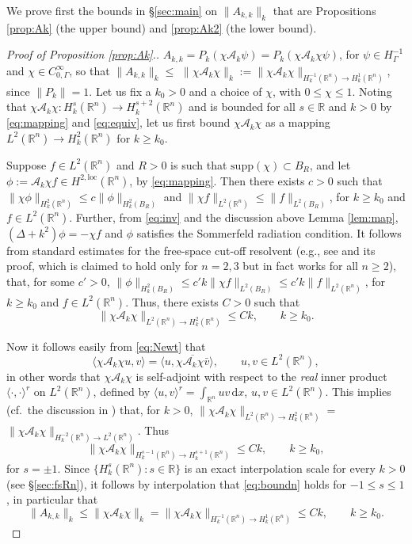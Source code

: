 \documentclass{birkjour}
\theoremstyle{definition}
\theoremstyle{remark}
\numberwithin{equation}{section}
\newcommand{\R}{\mathbb{R}}
\newcommand{\cA}{\mathcal{A}}
\newcommand{\supp}{\mathrm{supp}}
\newcommand{\rd}{\mathrm{d}}
\begin{document}
We prove first the bounds in \S\ref{sec:main} on $\|A_{k,k}\|_k$ that are Propositions \ref{prop:Ak} (the upper bound) and \ref{prop:Ak2} (the lower bound).

\begin{proof}[Proof of Proposition \ref{prop:Ak}.]
$A_{k,k} = P_k(\chi\cA_k\psi) =  P_k(\chi\cA_k\chi \psi)$, for $\psi\in H^{-1}_\Gamma$ and $\chi\in C^{\infty}_{0,\Gamma}$,  so that $\|A_{k,k}\|_k\leq$ $\|\chi \cA_k\chi\|_k:=\|\chi\cA_k\chi\|_{H^{-1}_k(\R^n)\to H^{1}_k(\R^n)}$, since $\|P_k\|=1$. Let us fix a $k_0>0$ and a choice of $\chi$, with $0\leq \chi\leq 1$. Noting that $\chi\cA_k\chi:H^s_k(\R^n)\to H^{s+2}_k(\R^n)$ and is bounded for all $s\in \R$ and $k>0$ by \eqref{eq:mapping} and \eqref{eq:equiv}, let us first bound $\chi\cA_k\chi$ as a mapping $L^2(\R^n)\to H^2_k(\R^n)$ for $k\geq k_0$. 

Suppose $f\in L^2(\R^n)$ and $R>0$ is such that $\supp(\chi)\subset B_R$, and let $\phi:=\cA_k \chi f\in H^{2,\mathrm{loc}}(\R^n)$, by \eqref{eq:mapping}. Then there exists $c>0$ such that $\|\chi\phi\|_{H_k^2(\R^n)} \leq c\|\phi\|_{H_k^2(B_R)}$ and $\|\chi f\|_{L^2(\R^n)}\leq \|f\|_{L^2(B_R)}$, for $k\geq k_0$ and $f\in L^2(\R^n)$. Further, from \eqref{eq:inv} and the discussion above Lemma \ref{lem:map}, $(\Delta+k^2)\phi = - \chi f$ and $\phi$ satisfies the Sommerfeld radiation condition. It follows from standard estimates for the free-space cut-off resolvent (e.g., see \cite[Cor.~2.2]{Spence:23} and its proof, which is claimed to hold only for $n=2,3$ but in fact works for all $n\geq 2$), that, for some $c'>0$, $\|\phi\|_{H_k^2(B_R)}\leq c'k\|\chi f\|_{L^2(B_R)}\leq c'k\| f\|_{L^2(\R^n)}$,  for $k\geq k_0$ and $f\in L^2(\R^n)$. Thus, there exists $C>0$ such that
$$
\|\chi\cA_k\chi\|_{L^2(\R^n)\to H^2_k(\R^n)} \leq Ck,  \qquad k\geq k_0. 
$$

 Now it follows easily from \eqref{eq:Newt} that
$$
\langle \chi \cA_k\chi u, v\rangle = \langle u,\overline{\chi \cA_k\chi \bar{v}}\rangle, \qquad u,v\in L^2(\R^n),
$$
in other words that $\chi\cA_k\chi$ is self-adjoint with respect to the  {\em real} inner product $\langle\cdot,\cdot\rangle^r$ on $L^2(\R^n)$, defined by  $\langle u,v\rangle^r=\int_{\R^n}uv\, \rd x$, $u,v\in L^2(\R^n)$.  This implies (cf.~the discussion in  \cite[\S2.3]{chandler2020high}) that, for $k>0$, $\|\chi\cA_k\chi\|_{L^2(\R^n)\to H^2_k(\R^n)} =$ $\|\chi\cA_k\chi\|_{H_k^{-2}(\R^n)\to L^2(\R^n)}$. Thus
\begin{equation} \label{eq:boundn}
\|\chi\cA_k\chi\|_{H_k^{s-1}(\R^n)\to H^{s+1}_k(\R^n)} \leq Ck,  \qquad k\geq k_0,
\end{equation}
for $s=\pm1$. Since $\{H_k^s(\R^n):s\in \R\}$ is an exact interpolation scale for every $k>0$ (see \S\ref{sec:fsRn}), it follows by interpolation that \eqref{eq:boundn} holds for $-1\leq s\leq 1$, in particular that
$$
\|A_{k,k}\|_k\leq \|\chi\cA_k\chi\|_k = \|\chi\cA_k\chi\|_{H^{-1}_k(\R^n)\to H^{1}_k(\R^n)} \leq Ck,  \qquad k\geq k_0.
$$
\end{proof}
\end{document}
